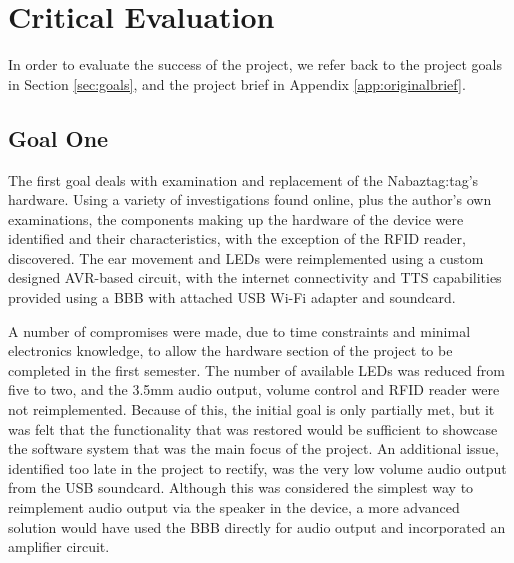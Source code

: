 \documentclass[12pt, a4paper]{article}
\begin{document}
	\section{Critical Evaluation}\label{sec:evaluation}

	In order to evaluate the success of the project, we refer back to the project goals in Section \ref{sec:goals}, and the project brief in Appendix \ref{app:originalbrief}.
	
	\subsection{Goal One}
	The first goal deals with examination and replacement of the Nabaztag:tag's hardware. Using a variety of investigations found online, plus the author's own examinations, the components making up the hardware of the device were identified and their characteristics, with the exception of the \ac{RFID} reader, discovered. The ear movement and \acp{LED} were reimplemented using a custom designed AVR-based circuit, with the internet connectivity and \ac{TTS} capabilities provided using a \ac{BBB} with attached \ac{USB} Wi-Fi adapter and soundcard.
	
	A number of compromises were made, due to time constraints and minimal electronics knowledge, to allow the hardware section of the project to be completed in the first semester. The number of available \acp{LED} was reduced from five to two, and the 3.5mm audio output, volume control and \ac{RFID} reader were not reimplemented. Because of this, the initial goal is only partially met, but it was felt that the functionality that was restored would be sufficient to showcase the software system that was the main focus of the project. An additional issue, identified too late in the project to rectify, was the very low volume audio output from the \ac{USB} soundcard. Although this was considered the simplest way to reimplement audio output via the speaker in the device, a more advanced solution would have used the \ac{BBB} directly for audio output and incorporated an amplifier circuit.
	
\end{document}
